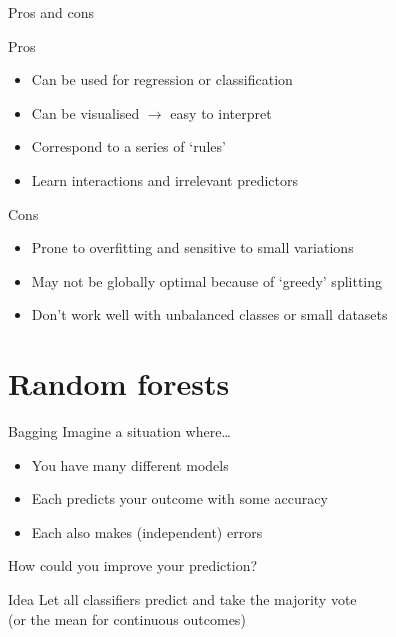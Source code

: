 \begin{frame}{Pros and cons}
    \begin{block}{Pros}
        \begin{itemize}
            \item Can be used for regression or classification
            \item Can be visualised $\rightarrow$ easy to interpret
            \item Correspond to a series of `rules'
            \item Learn interactions and irrelevant predictors
        \end{itemize}
    \end{block}
    \vfill
    \begin{block}{Cons}
        \begin{itemize}
            \item Prone to overfitting and sensitive to small variations
            \item May not be globally optimal because of `greedy' splitting
            \item Don't work well with unbalanced classes or small datasets
        \end{itemize}
    \end{block}
\end{frame}

\section{Random forests}

\begin{frame}{Bagging}
    Imagine a situation where\ldots
    \begin{itemize}
        \item You have many different models
        \item Each predicts your outcome with some accuracy
        \item Each also makes (independent) errors
    \end{itemize}
    How could you improve your prediction?
    \vfill\pause
    \begin{block}{Idea}
        Let all classifiers predict and take the majority vote \\
        (or the mean for continuous outcomes)
    \end{block}
\end{frame}

